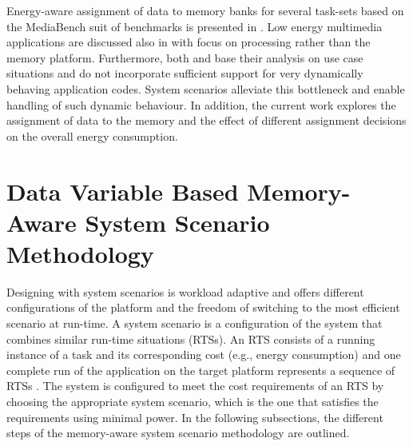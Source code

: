 Energy-aware assignment of data to memory banks for several task-sets based on the MediaBench suit of benchmarks is presented in \cite{Mar03}. Low energy multimedia applications are discussed also in \cite{Chu02} with focus on processing rather than the memory platform. Furthermore, both \cite{Mar03} and \cite{Chu02} base their analysis on use case situations and do not incorporate sufficient support for very dynamically behaving application codes. System scenarios alleviate this bottleneck and enable handling of such dynamic behaviour. In addition, the current work explores the assignment of data to the memory and the effect of different assignment decisions on the overall energy consumption.


\section{Data Variable Based Memory-Aware System Scenario Methodology}


Designing with system scenarios is workload adaptive and offers different configurations of the platform and the freedom of switching to the most efficient scenario at run-time. A system scenario is a configuration of the system that combines similar run-time situations (RTSs). An RTS consists of a running instance of a task and its corresponding cost (e.g., energy consumption) and one complete run of the application on the target platform represents a sequence of RTSs \cite{Elena2010}. The system is configured to meet the cost requirements of an RTS by choosing the appropriate system scenario, which is the one that satisfies the requirements using minimal power. In the following subsections, the different steps of the memory-aware system scenario methodology are outlined. 

